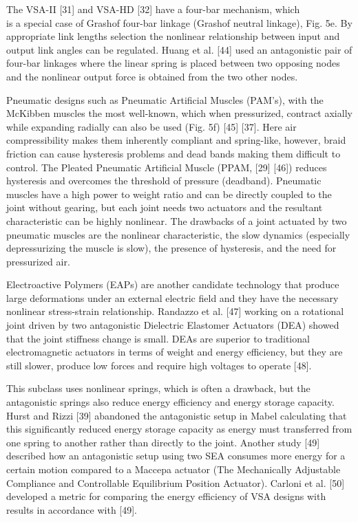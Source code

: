 \documentclass[10pt]{article}
\begin{document}
The VSA-II [31] and VSA-HD [32] have a four-bar mechanism, which\\[0pt]
is a special case of Grashof four-bar linkage (Grashof neutral linkage), Fig. 5e. By appropriate link lengths selection the nonlinear relationship between input and output link angles can be regulated. Huang et al. [44] used an antagonistic pair of four-bar linkages where the linear spring is placed between two opposing nodes and the nonlinear output force is obtained from the two other nodes.

Pneumatic designs such as Pneumatic Artificial Muscles (PAM's), with the McKibben muscles the most well-known, which when pressurized, contract axially while expanding radially can also be used (Fig. 5f) [45] [37]. Here air compressibility makes them inherently compliant and spring-like, however, braid friction can cause hysteresis problems and dead bands making them difficult to control. The Pleated Pneumatic Artificial Muscle (PPAM, [29] [46]) reduces hysteresis and overcomes the threshold of pressure (deadband). Pneumatic muscles have a high power to weight ratio and can be directly coupled to the joint without gearing, but each joint needs two actuators and the resultant characteristic can be highly nonlinear. The drawbacks of a joint actuated by two pneumatic muscles are the nonlinear characteristic, the slow dynamics (especially depressurizing the muscle is slow), the presence of hysteresis, and the need for pressurized air.

Electroactive Polymers (EAPs) are another candidate technology that produce large deformations under an external electric field and they have the necessary nonlinear stress-strain relationship. Randazzo et al. [47] working on a rotational joint driven by two antagonistic Dielectric Elastomer Actuators (DEA) showed that the joint stiffness change is small. DEAs are superior to traditional electromagnetic actuators in terms of weight and energy efficiency, but they are still slower, produce low forces and require high voltages to operate [48].

This subclass uses nonlinear springs, which is often a drawback, but the antagonistic springs also reduce energy efficiency and energy storage capacity. Hurst and Rizzi [39] abandoned the antagonistic setup in Mabel calculating that this significantly reduced energy storage capacity as energy must transferred from one spring to another rather than directly to the joint. Another study [49] described how an antagonistic setup using two SEA consumes more energy for a certain motion compared to a Maccepa actuator (The Mechanically Adjustable Compliance and Controllable Equilibrium Position Actuator). Carloni et al. [50] developed a metric for comparing the energy efficiency of VSA designs with results in accordance with [49].
\end{document}
